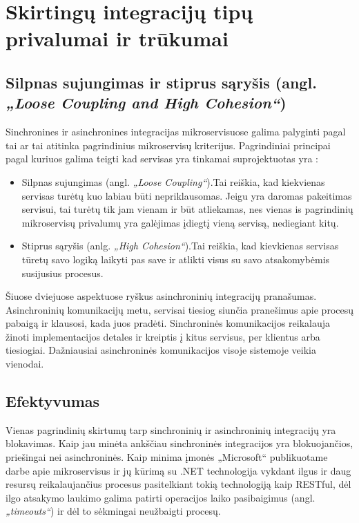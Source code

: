 \section{Skirtingų integracijų tipų privalumai ir trūkumai}


\subsection{Silpnas sujungimas ir stiprus sąryšis (angl. \textit{„Loose Coupling and High Cohesion“})}
Sinchronines ir asinchronines integracijas mikroservisuose galima palyginti pagal tai ar tai atitinka pagrindinius mikroservisų
kriterijus. Pagrindiniai principai pagal kuriuos galima teigti kad servisas yra tinkamai suprojektuotas yra \cite{Bk2}:

\begin{itemize}
  \item Silpnas sujungimas (angl. \textit{„Loose Coupling“}).Tai reiškia, kad kiekvienas servisas turėtų kuo labiau būti nepriklausomas. Jeigu yra daromas pakeitimas servisui, tai turėtų
  tik jam vienam ir būt atliekamas, nes vienas is pagrindinių mikroservisų privalumų yra galėjimas įdiegtį vieną servisą, nediegiant kitų.
  \item Stiprus sąryšis (anlg. \textit{„High Cohesion“}).Tai reiškia, kad kievkienas servisas tūretų savo logiką laikyti 
  pas save ir atlikti visus su savo atsakomybėmis susijusius procesus.
\end{itemize}

Šiuose dviejuose aspektuose ryškus asinchroninių integracijų pranašumas. Asinchroninių komunikacijų metu, servisai tiesiog siunčia pranešimus apie procesų pabaigą ir 
klausosi, kada juos pradėti. Sinchroninės komunikacijos reikalauja žinoti implementacijos detales ir kreiptis į kitus servisus, per klientus arba tiesiogiai.
Dažniausiai asinchroninės komunikacijos visoje sistemoje veikia vienodai.

\subsection{Efektyvumas}

Vienas pagrindinių skirtumų tarp sinchroninių ir asinchroninių integracijų yra blokavimas. Kaip jau minėta ankščiau
sinchroninės integracijos yra blokuojančios, priešingai nei asinchroninės. Kaip minima įmonės „Microsoft“
publikuotame darbe apie mikroservisus ir jų kūrimą su .NET technologija \cite{Misc1} vykdant ilgus ir daug resursų reikalaujančius procesus
pasitelkiant tokią technologiją kaip RESTful, dėl ilgo atsakymo laukimo galima patirti operacijos laiko pasibaigimus (angl. \textit{„timeouts“})
ir dėl to sėkmingai neužbaigti procesų.

